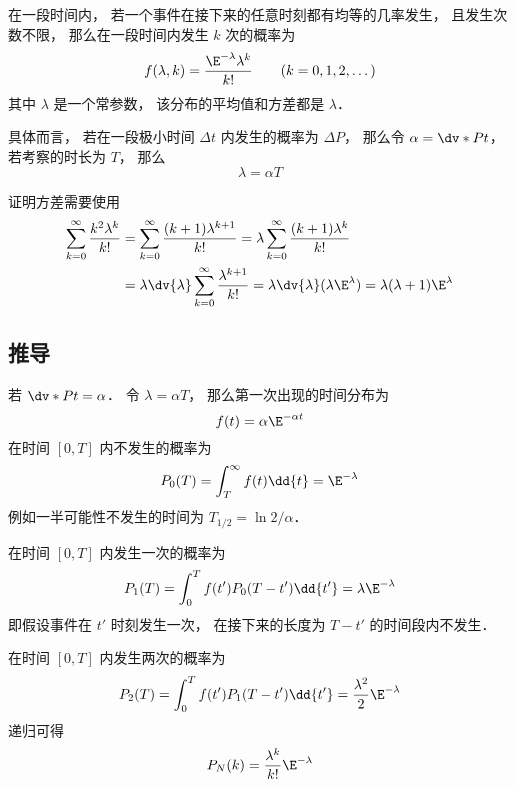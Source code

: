 
\begin{issues}
\issueDraft
\end{issues}

在一段时间内， 若一个事件在接下来的任意时刻都有均等的几率发生， 且发生次数不限， 那么在一段时间内发生 $k$ 次的概率为
\begin{equation}
f(\lambda, k) = \frac{\E^{-\lambda}\lambda^k}{k!} \qquad (k = 0,1,2,\dots)
\end{equation}
其中 $\lambda$ 是一个常参数， 该分布的平均值和方差都是 $\lambda$．

具体而言， 若在一段极小时间 $\Delta t$ 内发生的概率为 $\Delta P$， 那么令 $\alpha = \dv*{P}{t}$， 若考察的时长为 $T$， 那么
\begin{equation}
\lambda = \alpha T
\end{equation}


证明方差需要使用
\begin{equation}
\begin{aligned}
\sum_{k=0}^\infty \frac{k^2\lambda^{k}}{k!}
&= \sum_{k=0}^\infty \frac{(k+1)\lambda^{k+1}}{k!}
= \lambda \sum_{k=0}^\infty \frac{(k+1)\lambda^k}{k!}\\
&= \lambda\dv{\lambda} \sum_{k=0}^\infty \frac{\lambda^{k+1}}{k!}
= \lambda \dv{\lambda} (\lambda \E^{\lambda})
= \lambda(\lambda+1)\E^{\lambda}
\end{aligned}
\end{equation}

\subsection{推导}
若 $\dv*{P}{t} = \alpha$． 令 $\lambda = \alpha T$， 那么第一次出现的时间分布为
\begin{equation}
f(t) = \alpha\E^{-\alpha t}
\end{equation}
在时间 $[0,T]$ 内不发生的概率为
\begin{equation}
P_0(T) = \int_{T}^\infty f(t) \dd{t} = \E^{-\lambda}
\end{equation}
例如一半可能性不发生的时间为 $T_{1/2} = \ln 2/\alpha$．

在时间 $[0,T]$ 内发生一次的概率为
\begin{equation}
P_1(T) = \int_{0}^{T} f(t') P_0(T-t')\dd{t'} = \lambda \E^{-\lambda}
\end{equation}
即假设事件在 $t'$ 时刻发生一次， 在接下来的长度为 $T-t'$ 的时间段内不发生．

在时间 $[0,T]$ 内发生两次的概率为
\begin{equation}
P_2(T) = \int_{0}^{T} f(t') P_1(T-t')\dd{t'} = \frac{\lambda^2}{2}\E^{-\lambda}
\end{equation}
递归可得
\begin{equation}
P_N(k) = \frac{\lambda^k}{k!}\E^{-\lambda}
\end{equation}
